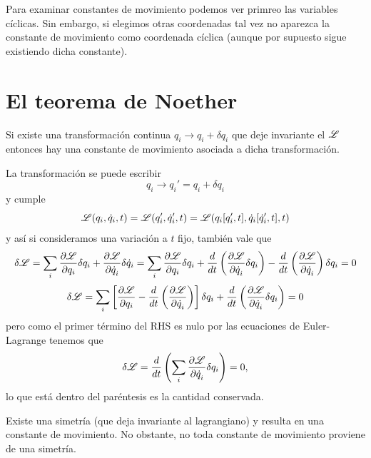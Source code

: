 \documentclass[10pt,oneside]{CBFT_book}
\begin{document}

Para examinar constantes de movimiento podemos ver primreo las variables cíclicas. Sin embargo, si elegimos otras 
coordenadas tal vez no aparezca la constante de movimiento como coordenada cíclica (aunque por supuesto sigue 
existiendo dicha constante).

\section{El teorema de Noether}

Si existe una transformación continua $q_i \longrightarrow q_i + \delta q_i$ que deje invariante el
$\mathscr{L}$ entonces hay una constante de movimiento asociada a dicha transformación.

La transformación se puede escribir 
\[
	q_i \longrightarrow q_i' = q_i + \delta q_i
\]
y cumple 
\[
	\mathscr{L}(q_i, \dot{q}_i , t) = \mathscr{L}(q_i', \dot{q}_i' , t) =
	\mathscr{L}(q_i[q_i',t], \dot{q}_i[\dot{q}_i',t] , t)
\]
y así si consideramos una variación a $t$ fijo, también vale que 
\[
	\delta \mathscr{L} = \sum_i \frac{\partial^{\hspace{-0.05em}} {\mathscr{L}}}{\partial {q_i}^{\hspace{-0.05em}}}\delta q_i + \frac{\partial^{\hspace{-0.05em}} {\mathscr{L}}}{\partial {\dot{q}_i}^{\hspace{-0.05em}}}\delta \dot{q}_i =
	\sum_i \frac{\partial^{\hspace{-0.05em}} {\mathscr{L}}}{\partial {q_i}^{\hspace{-0.05em}}}\delta q_i + \frac{d}{dt}\left( \frac{\partial^{\hspace{-0.05em}} {\mathscr{L}}}{\partial {\dot{q}_i}^{\hspace{-0.05em}}}\delta q_i \right)
	- \frac{d}{dt}\left( \frac{\partial^{\hspace{-0.05em}} {\mathscr{L}}}{\partial {\dot{q}_i}^{\hspace{-0.05em}}} \right) \delta q_i = 0
\]
\[
	\delta \mathscr{L} = \sum_i \left[ \frac{\partial^{\hspace{-0.05em}} {\mathscr{L}}}{\partial {q_i}^{\hspace{-0.05em}}} - \frac{d}{dt}\left( \frac{\partial^{\hspace{-0.05em}} {\mathscr{L}}}{\partial {\dot{q}_i}^{\hspace{-0.05em}}} \right) \right]
	\delta q_i + \frac{d}{dt}\left( \frac{\partial^{\hspace{-0.05em}} {\mathscr{L}}}{\partial {\dot{q}_i}^{\hspace{-0.05em}}}\delta q_i \right) = 0
\]
pero como el primer término del RHS es nulo por las ecuaciones de Euler-Lagrange tenemos que 
\[
	\delta \mathscr{L} = \frac{d}{dt}\left( \sum_i \frac{\partial^{\hspace{-0.05em}} {\mathscr{L}}}{\partial {\dot{q}_i}^{\hspace{-0.05em}}}\delta q_i \right)  = 0,
\]
lo que está dentro del paréntesis es la cantidad conservada. 

Existe una simetría (que deja invariante al lagrangiano) y resulta en una constante de movimiento.
No obstante, no toda constante de movimiento proviene de una simetría.
\end{document}
